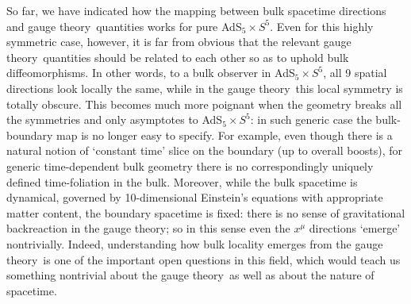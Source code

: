 \documentclass[12pt,a4paper]{article}
\def\GT{gauge theory}
\def\adss#1#2{AdS$_{#1} \times S^{#2}$}
\begin{document}
So far, we have indicated how the mapping between bulk spacetime directions and \GT\ quantities   works for pure \adss55.   Even for this highly symmetric case, however,  it is far from obvious that the relevant \GT\ quantities should be related to each other so as to uphold bulk diffeomorphisms.  In other words, to a bulk observer in \adss55, all 9 spatial directions look locally the same, while in the \GT\ this local symmetry is totally obscure.  
This becomes much more poignant when the geometry breaks all the symmetries and only asymptotes to \adss55: in such generic case the bulk-boundary map is no longer easy to specify. 
For example, even though there is a natural notion of `constant time' slice on the boundary (up to overall boosts), for generic  time-dependent bulk geometry there is no correspondingly uniquely defined time-foliation in the bulk.  
Moreover, while the bulk spacetime is dynamical, governed by 10-dimensional Einstein's equations with appropriate matter content, the boundary spacetime is fixed: there is no sense of gravitational backreaction in the \GT; so in this sense even the $x^\mu$ directions `emerge' nontrivially.
Indeed, understanding how bulk locality emerges from the \GT\ is one of the important open questions in this field, which would teach us something nontrivial about the \GT\ as well as about the nature of spacetime.
\end{document}

